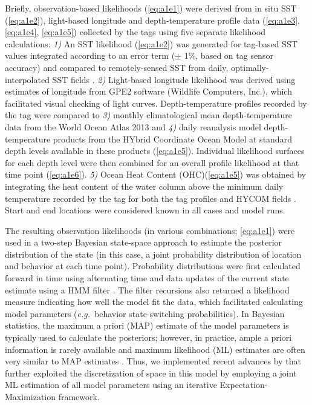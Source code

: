 Briefly, observation-based likelihoods (\cref{eq:a1e1}) were derived from in
situ SST (\cref{eq:a1e2}), light-based longitude and depth-temperature profile
data (\cref{eq:a1e3}, \cref{eq:a1e4}, \cref{eq:a1e5}) collected by the tags using five separate
likelihood calculations: \emph{1)} An SST likelihood (\cref{eq:a1e2}) was
generated for tag-based SST values integrated according to an error term
($\pm$ 1\%, based on tag sensor accuracy) and compared to
remotely-sensed SST from daily, optimally-interpolated SST fields
\citep[OI-SST, 0.25$^{\circ}$ resolution;][]{Banzon2016}. \emph{2)} Light-based
longitude likelihood was derived using estimates of longitude from GPE2
software (Wildlife Computers, Inc.), which facilitated visual checking
of light curves. Depth-temperature profiles recorded by the tag were
compared to \emph{3)} monthly climatological mean depth-temperature data
from the World Ocean Atlas 2013 \citep[WOA, 0.25$^{\circ}$
resolution;][]{Locarnini2013} and \emph{4)} daily reanalysis model
depth-temperature products from the HYbrid Coordinate Ocean Model
\citep[HYCOM, 0.08$^{\circ}$ resolution;][]{Chassignet2007} at standard depth
levels available in these products (\cref{eq:a1e5}). Individual likelihood
surfaces for each depth level were then combined for an overall profile
likelihood at that time point (\cref{eq:a1e6}). \emph{5)} Ocean Heat Content
(OHC)(\cref{eq:a1e5}) was obtained by integrating the heat content of the water
column above the minimum daily temperature recorded by the tag for both
the tag profiles and HYCOM fields \citep[\cref{eq:a1e4};][]{Luo2015}. Start and
end locations were considered known in all cases and model runs.

The resulting observation likelihoods (in various combinations; \cref{eq:a1e1})
were used in a two-step Bayesian state-space approach to estimate the
posterior distribution of the state (in this case, a joint probability
distribution of location and behavior at each time point). Probability
distributions were first calculated forward in time using alternating
time and data updates of the current state estimate using a HMM filter
\citep[for a detailed methodology of the HMM filter see Appendix 2
in][]{Pedersen2011}. The filter recursions also returned a likelihood
measure indicating how well the model fit the data, which facilitated
calculating model parameters (\emph{e.g.}~behavior state-switching
probabilities). In Bayesian statistics, the maximum a priori (MAP)
estimate of the model parameters is typically used to calculate the
posteriors; however, in practice, ample a priori information is rarely
available and maximum likelihood (ML) estimates are often very similar
to MAP estimates \citep{Jonsen2005}. Thus, we implemented recent
advances by \citet{Woillez2016} that further exploited the
discretization of space in this model by employing a joint ML estimation
of all model parameters using an iterative Expectation-Maximization
framework.

